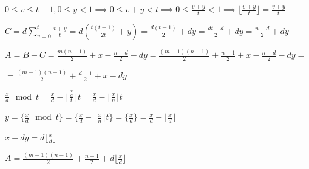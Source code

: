 \documentclass{article}
\begin{document}
\( 0 \leq v \leq t - 1, 0 \leq y < 1 \implies 0 \leq v + y < t \implies 0 \leq \frac{v+y}{t} < 1 \implies \lfloor \frac{v + y} {t} \rfloor = \frac{v + y}{t} \)

\( C = d\sum_{v=0}^t \frac{v+y}{t} = d(\frac{t(t-1)}{2t} + y) = \frac{d(t-1)}{2} + dy = \frac{dt-d}{2} + dy = \frac{n-d}{2} + dy \)

\( A = B - C = \frac{m(n-1)}{2} + x - \frac{n-d}{2} - dy = \frac{(m-1)(n-1)}{2} + \frac{n-1}{2} + x - \frac{n-d}{2} - dy = \)

\( = \frac{(m-1)(n-1)}{2} + \frac{d-1}{2} + x - dy \)

\( \frac{x}{d} \mod t = \frac{x}{d} - \lfloor \frac{\frac{x}{d}}{t} \rfloor t = \frac{x}{d} - \lfloor \frac{x}{n} \rfloor t \)

\( y = \{ \frac{x}{d} \mod t \} = \{ \frac{x}{d} - \lfloor \frac{x}{n} \rfloor t \} = \{ \frac{x}{d} \} = \frac{x}{d} - \lfloor \frac{x}{d} \rfloor \)

\( x - dy = d \lfloor \frac{x}{d} \rfloor \)

\( A = \frac{(m-1)(n-1)}{2} + \frac{n-1}{2} + d \lfloor \frac{x}{d} \rfloor \)
\end{document}
